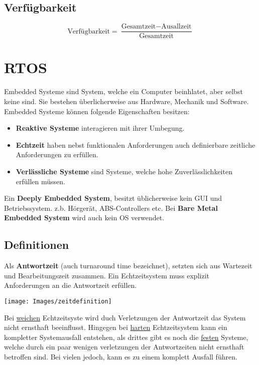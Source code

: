 \subsection{Verfügbarkeit}
\[
\text{Verfügbarkeit} = \dfrac{\text{Gesamtzeit} - \text{Ausallzeit}}{\text{Gesamtzeit}}
\]

\section{RTOS}
Embedded Systeme sind System, welche ein Computer beinhlatet, aber selbst keine sind. Sie bestehen überlicherweise aus Hardware, Mechanik und Software. Embedded Systeme können folgende Eigenschaften besitzen:
\begin{itemize}
	\item \textbf{Reaktive Systeme} interagieren mit ihrer Umbegung.
	\item \textbf{Echtzeit} haben nebst funktionalen Anforderungen auch definierbare zeitliche Anforderungen zu erfüllen.
	\item \textbf{Verlässliche Systeme} sind Systeme, welche hohe Zuverlässlichkeiten erfüllen müssen.
\end{itemize}

Ein \textbf{Deeply Embedded System}, besitzt üblicherweise kein GUI und Betriebssystem. z.b. Hörgerät, ABS-Controllers etc. Bei \textbf{Bare Metal Embedded System} wird auch kein OS verwendet.

\subsection{Definitionen}
Als \textbf{Antwortzeit} (auch turnaround time bezeichnet), setzten sich aus Wartezeit und Bearbeitungszeit zusammen. Ein Echtzeitsystem muss explizit Anforderungen an die Antwortzeit erfüllen. 
\begin{center}
	\texttt{[image: Images/zeitdefinition]}
\end{center}

Bei \underline{weichen} Echtzeitsyste wird duch Verletzungen der Antwortzeit das System nicht ernsthaft beeinflusst. Hingegen bei \underline{harten} Echtzeitsystem kann ein kompletter Systemausfall entstehen, als drittes gibt es noch die \underline{festen} Systeme, welche durch ein paar 
wenigen verletzungen der Antwortzeiten nicht ernsthaft betroffen sind. Bei vielen jedoch, kann es zu einem komplett Ausfall führen.

